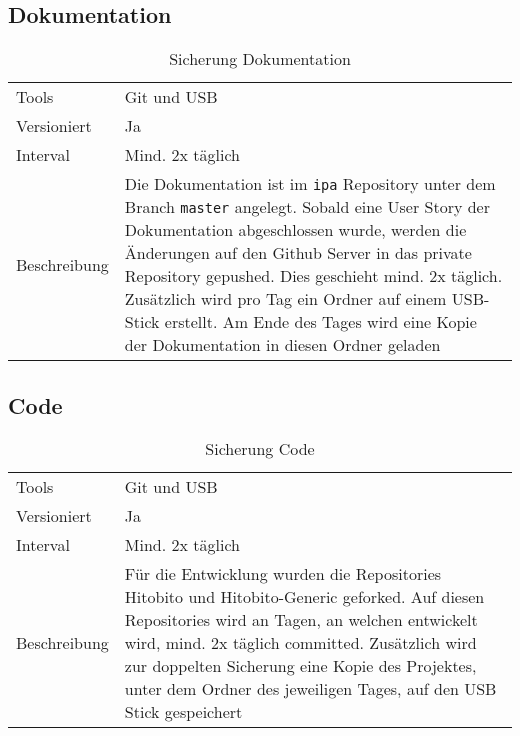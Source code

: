 \subsection{Dokumentation}
\begin{table}[h!]
    \begin{tabular}{|L{0.4\textwidth}|L{0.5\textwidth}|}
        \hline
          \\[12pt]
        \hline
        Tools & Git und USB \\
        \hline
        Versioniert & Ja \\
        \hline
        Interval & Mind. 2x täglich \\
        \hline
        Beschreibung & Die Dokumentation ist im \texttt{ipa} Repository unter dem Branch \texttt{master} angelegt.
        Sobald eine User Story der Dokumentation abgeschlossen wurde, werden die Änderungen auf den Github Server in das private Repository
        gepushed. Dies geschieht mind. 2x täglich. Zusätzlich wird pro Tag ein Ordner auf einem USB-Stick erstellt.  Am Ende des Tages wird eine Kopie der Dokumentation
        in diesen Ordner geladen \\
      \hline
      \end{tabular}
      \caption{Sicherung Dokumentation}
\end{table}

\newpage

\subsection{Code}
\begin{table}[h!]
    \begin{tabular}{|L{0.4\textwidth}|L{0.5\textwidth}|}
        \hline
          \\[12pt]
        \hline
        Tools & Git und USB \\
        \hline
        Versioniert & Ja \\
        \hline
        Interval & Mind. 2x täglich \\
        \hline
        Beschreibung & Für die Entwicklung wurden die Repositories Hitobito und Hitobito-Generic geforked.
        Auf diesen Repositories wird an Tagen, an welchen entwickelt wird, mind. 2x täglich committed. Zusätzlich wird zur doppelten Sicherung eine Kopie des Projektes, unter dem Ordner des jeweiligen Tages,
        auf den USB Stick gespeichert \\
      \hline
      \end{tabular}
      \caption{Sicherung Code}
\end{table}

